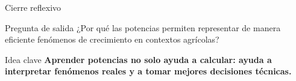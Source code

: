 \documentclass[aspectratio=169,10pt,handout]{beamer}
\newcommand{\pp}{\pause}
\newenvironment{ideaBox}
{\begin{exampleblock}{Idea clave}}
	{\end{exampleblock}}
\begin{document}
	\begin{frame}{Cierre reflexivo}
		\begin{exampleblock}{Pregunta de salida}
			¿Por qué las potencias permiten representar de manera eficiente fenómenos de crecimiento en contextos agrícolas?
		\end{exampleblock}
		
		\pp
		
		\begin{ideaBox}
			\centering
			\textbf{Aprender potencias no solo ayuda a calcular: ayuda a interpretar fenómenos reales y a tomar mejores decisiones técnicas.}
		\end{ideaBox}
	\end{frame}
	
\end{document}
